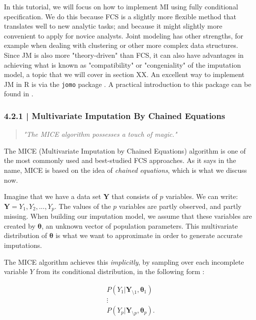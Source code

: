 In this tutorial, we will focus on how to implement MI using fully conditional specification. We do this because FCS is a slightly more flexible method that translates well to new analytic tasks; and because it might slightly more convenient to apply for novice analysts. Joint modeling has other strengths, for example when dealing with clustering or other more complex data structures. Since JM is also more "theory-driven" than FCS, it can also have advantages in achieving what is known as "compatibility" or "congeniality" of the imputation model, a topic that we will cover in section XX. An excellent way to implement JM in \textsf{R} is via the \texttt{jomo} package \citep{jomo}. A practical introduction to this package can be found in \citet{quartagno2019jomo}.


\subsubsection{{\normalfont\textsf{\textcolor{sBlue}{\small 4.2.1 |}}} Multivariate Imputation By Chained Equations}

\begin{quote}
    \emph{"The MICE algorithm possesses a touch of magic."} \\ \citep{van2011mice}
\end{quote}

The \textsf{MICE} (Multivariate Imputation by Chained Equations) algorithm is one of the most commonly used and best-studied FCS approaches. As it says in the name, \textsf{MICE} is based on the idea of \emph{chained equations}, which is what we discuss now.

Imagine that we have a data set $\mathbf{Y}$ that consists of $p$ variables. We can write: $\mathbf{Y} = Y_1, Y_2, ..., Y_p$. The values of the $p$ variables are partly observed, and partly missing. When building our imputation model, we assume that these variables are created by $\boldsymbol{\theta}$, an unknown vector of population parameters. This multivariate distribution of $\boldsymbol{\theta}$ is what we want to approximate in order to generate accurate imputations. 

The \textsf{MICE} algorithm achieves this \emph{implicitly}, by sampling over each incomplete variable $Y$ from its conditional distribution, in the following form \citep{van2011mice}:


\begin{equation}
\begin{split}
& P(Y_1|\mathbf{Y}_{\setminus1}, \mathbf{\theta}_1) \\
& \vdots \\
& P(Y_p|\mathbf{Y}_{\setminus p}, \mathbf{\theta}_p).
\end{split}
\end{equation}


